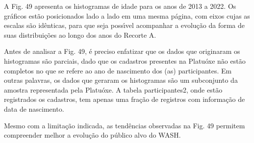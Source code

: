 \documentclass[
12pt,		%
openright,	%
twoside,  %
a4paper,			%
chapter=TITLE,		%
english,			%
french,				%
spanish,			%
brazil				%
]{USPSC-classe/USPSC}
\begin{document}
A Fig. 49 apresenta os histogramas de idade para os anos de 2013 a 2022. Os gr\'aficos est\~ao posicionados lado a lado em uma mesma p\'agina, com eixos cujas as escalas s\~ao id\^enticas, para que seja poss\'{\i}vel acompanhar a evolu\c{c}\~ao da forma de suas distribui\c{c}\~oes ao longo dos anos do Recorte A.









Antes de analisar a Fig. 49, \'e preciso enfatizar que os dados que originaram os histogramas s\~ao parciais, dado que os cadastros presentes na Platu\'oxe n\~ao est\~ao completos no que se refere ao ano de nascimento dos (as) participantes. Em outras palavras, os dados que geraram os histogramas s\~ao um subconjunto da amostra representada pela Platu\'oxe. A tabela participantes2, onde est\~ao registrados os cadastros, tem apenas uma fra\c{c}\~ao de registros com informa\c{c}\~ao de data de nascimento.









Mesmo com a limita\c{c}\~ao indicada, as tend\^encias observadas na Fig. 49 permitem compreender melhor a evolu\c{c}\~ao do p\'ublico alvo do WASH.
\end{document}
